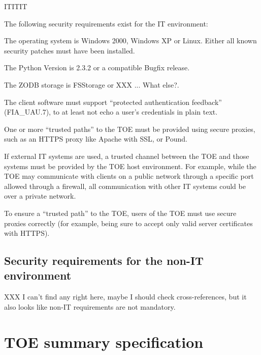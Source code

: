 \documentclass[12pt,english]{scrbook}
\begin{document}
ITITIT

The following security requirements exist for the IT environment:

The operating system is Windows 2000, Windows XP or Linux. Either all
known security patches must have been installed.

The Python Version is 2.3.2 or a compatible Bugfix release.

The ZODB storage is FSStorage or XXX ... What else?.

The client software must support ``protected authentication feedback''
(FIA{\_}UAU.7), to at least not echo a user's credentials in plain text.

One or more ``trusted paths'' to the TOE must be provided using secure
proxies, such as an HTTPS proxy like Apache with SSL, or Pound.

If external IT systems are used, a trusted channel between the TOE and
those systems must be provided by the TOE host environment.  For
example, while the TOE may communicate with clients on a public
network through a specific port allowed through a firewall, all
communication with other IT systems could be over a private network.

To ensure a ``trusted path'' to the TOE, users of the TOE must use
secure proxies correctly (for example, being sure to accept only
valid server certificates with HTTPS).





\section{Security requirements for the non-IT environment}

XXX I can't find any right here, maybe I should check cross-references, but it
also looks like non-IT requirements are not mandatory.





\chapter{TOE summary specification}


\end{document}
